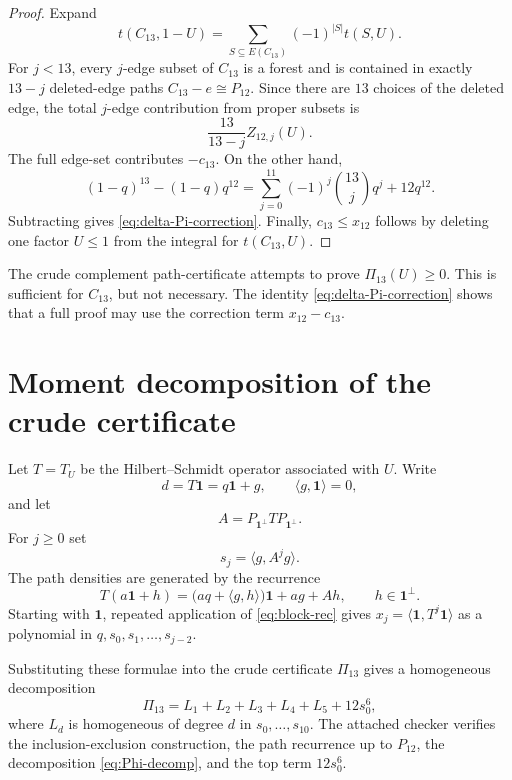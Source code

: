 \documentclass[11pt]{article}
\newcommand{\one}{\mathbf 1}
\newcommand{\ip}[2]{\langle #1,#2\rangle}
\begin{document}
\begin{proof}
Expand
\[
        t(C_{13},1-U)=\sum_{S\subseteq E(C_{13})}(-1)^{|S|}t(S,U).
\]
For $j<13$, every $j$-edge subset of $C_{13}$ is a forest and is contained in
exactly $13-j$ deleted-edge paths $C_{13}-e\cong P_{12}$.  Since there are $13$
choices of the deleted edge, the total $j$-edge contribution from proper subsets
is
\[
        \frac{13}{13-j}Z_{12,j}(U).
\]
The full edge-set contributes $-c_{13}$.  On the other hand,
\[
        (1-q)^{13}-(1-q)q^{12}
        =\sum_{j=0}^{11}(-1)^j\binom{13}{j}q^j+12q^{12}.
\]
Subtracting gives \eqref{eq:delta-Pi-correction}.  Finally,
$c_{13}\le x_{12}$ follows by deleting one factor $U\le1$ from the integral for
$t(C_{13},U)$.
\end{proof}

The crude complement path-certificate attempts to prove $\Pi_{13}(U)\ge0$.
This is sufficient for $C_{13}$, but not necessary.  The identity
\eqref{eq:delta-Pi-correction} shows that a full proof may use the correction
term $x_{12}-c_{13}$.

\section{Moment decomposition of the crude certificate}

Let $T=T_U$ be the Hilbert--Schmidt operator associated with $U$.  Write
\[
        d=T\one=q\one+g,
        \qquad \ip{g}{\one}=0,
\]
and let
\[
        A=P_{\one^\perp}TP_{\one^\perp}.
\]
For $j\ge0$ set
\[
        s_j=\ip{g}{A^j g}.
\]
The path densities are generated by the recurrence
\begin{equation}\label{eq:block-rec}
        T(a\one+h)=\bigl(aq+\ip{g}{h}\bigr)\one+ag+Ah,
        \qquad h\in\one^\perp.
\end{equation}
Starting with $\one$, repeated application of \eqref{eq:block-rec} gives
$x_j=\ip{\one}{T^j\one}$ as a polynomial in $q,s_0,s_1,\ldots,s_{j-2}$.

Substituting these formulae into the crude certificate $\Pi_{13}$ gives a
homogeneous decomposition
\begin{equation}\label{eq:Phi-decomp}
        \Pi_{13}=L_1+L_2+L_3+L_4+L_5+12s_0^6,
\end{equation}
where $L_d$ is homogeneous of degree $d$ in $s_0,\ldots,s_{10}$.
The attached checker verifies the inclusion-exclusion construction, the path
recurrence up to $P_{12}$, the decomposition
\eqref{eq:Phi-decomp}, and the top term $12s_0^6$.
\end{document}
